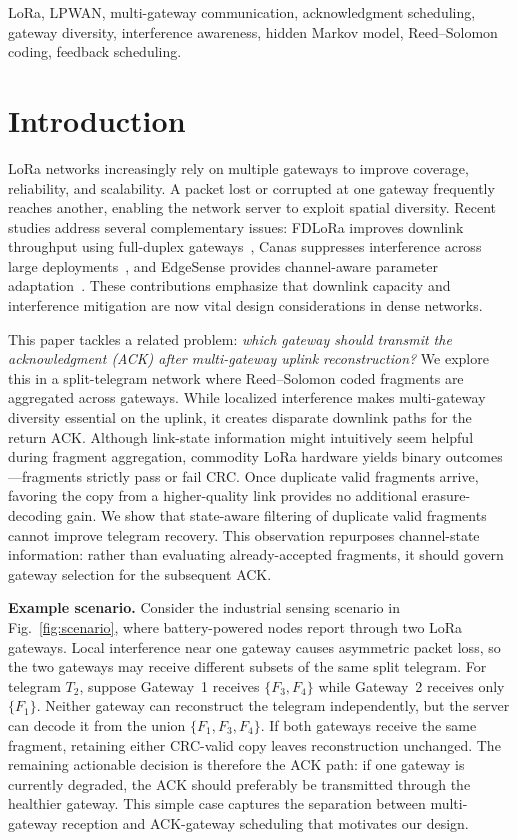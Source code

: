 \documentclass[journal]{IEEEtran}
\begin{document}
\begin{IEEEkeywords}
LoRa, LPWAN, multi-gateway communication, acknowledgment scheduling, gateway diversity, interference awareness, hidden Markov model, Reed--Solomon coding, feedback scheduling.
\end{IEEEkeywords}

\section{Introduction}

LoRa networks increasingly rely on multiple gateways to improve coverage, reliability, and scalability. A packet lost or corrupted at one gateway frequently reaches another, enabling the network server to exploit spatial diversity. Recent studies address several complementary issues: FDLoRa improves downlink throughput using full-duplex gateways~\cite{yu2025fdlora}, Canas suppresses interference across large deployments~\cite{yu2026canas}, and EdgeSense provides channel-aware parameter adaptation~\cite{lodhi2026edgesense}. These contributions emphasize that downlink capacity and interference mitigation are now vital design considerations in dense networks.

This paper tackles a related problem: \emph{which gateway should transmit the acknowledgment (ACK) after multi-gateway uplink reconstruction?} We explore this in a split-telegram network where Reed--Solomon coded fragments are aggregated across gateways. While localized interference makes multi-gateway diversity essential on the uplink, it creates disparate downlink paths for the return ACK. Although link-state information might intuitively seem helpful during fragment aggregation, commodity LoRa hardware yields binary outcomes—fragments strictly pass or fail CRC. Once duplicate valid fragments arrive, favoring the copy from a higher-quality link provides no additional erasure-decoding gain. We show that state-aware filtering of duplicate valid fragments cannot improve telegram recovery. This observation repurposes channel-state information: rather than evaluating already-accepted fragments, it should govern gateway selection for the subsequent ACK.

\textbf{Example scenario.} Consider the industrial sensing scenario in Fig.~\ref{fig:scenario}, where battery-powered nodes report through two LoRa gateways. Local interference near one gateway causes asymmetric packet loss, so the two gateways may receive different subsets of the same split telegram. For telegram $T_2$, suppose Gateway~1 receives $\{F_3,F_4\}$ while Gateway~2 receives only $\{F_1\}$. Neither gateway can reconstruct the telegram independently, but the server can decode it from the union $\{F_1,F_3,F_4\}$. If both gateways receive the same fragment, retaining either CRC-valid copy leaves reconstruction unchanged. The remaining actionable decision is therefore the ACK path: if one gateway is currently degraded, the ACK should preferably be transmitted through the healthier gateway. This simple case captures the separation between multi-gateway reception and ACK-gateway scheduling that motivates our design.
\end{document}
